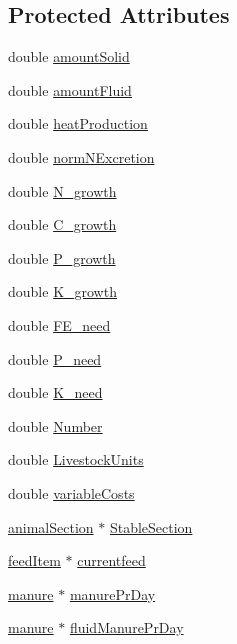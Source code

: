 \subsection*{Protected Attributes}
\begin{DoxyCompactItemize}
\item 
double \hyperlink{classanimal_ae574d91108a470dd180278e787c95cb0}{amountSolid}
\item 
double \hyperlink{classanimal_a980913ef37036f30fdd2a743f190ad7c}{amountFluid}
\item 
double \hyperlink{classanimal_abce3ac87f3167d381f64de4784eeeaa6}{heatProduction}
\item 
double \hyperlink{classanimal_a0a5d1b8b99abe66a1a127973045009c6}{normNExcretion}
\item 
double \hyperlink{classanimal_a8b0bbe3bd6f4038bbafa212931f21ff2}{N\_\-growth}
\item 
double \hyperlink{classanimal_a029e384f9d14c602ca4569cd7928c6f7}{C\_\-growth}
\item 
double \hyperlink{classanimal_a000f5ea905fb5f547ac001e76c6a94f0}{P\_\-growth}
\item 
double \hyperlink{classanimal_a7a2c048b6e72a0b5d0f1a7f2191526f3}{K\_\-growth}
\item 
double \hyperlink{classanimal_a2c6e10a16f9d0368763cc2e133e289f2}{FE\_\-need}
\item 
double \hyperlink{classanimal_ac6bf667254a80f2526a5234592cb3fae}{P\_\-need}
\item 
double \hyperlink{classanimal_a3ef7ab5c8f0060a21c780dbe4de1589d}{K\_\-need}
\item 
double \hyperlink{classanimal_aecd025e91f381d7922621868cf5dad55}{Number}
\item 
double \hyperlink{classanimal_a04fb217c6513ffc36ddd036d2c38ee98}{LivestockUnits}
\item 
double \hyperlink{classanimal_a9e4809e28ae703c997e135bf28469163}{variableCosts}
\item 
\hyperlink{classanimal_section}{animalSection} $\ast$ \hyperlink{classanimal_a02b1cede3021c02ac7fe882dd5dfb036}{StableSection}
\item 
\hyperlink{classfeed_item}{feedItem} $\ast$ \hyperlink{classanimal_a824070a2c5f811b0613e3767b298c0f1}{currentfeed}
\item 
\hyperlink{classmanure}{manure} $\ast$ \hyperlink{classanimal_a4a5b5cc4023830136ab5d9f81f4dcb9d}{manurePrDay}
\item 
\hyperlink{classmanure}{manure} $\ast$ \hyperlink{classanimal_a7ffc4d8f055968d726673566f78f783f}{fluidManurePrDay}

\end{DoxyCompactItemize}
